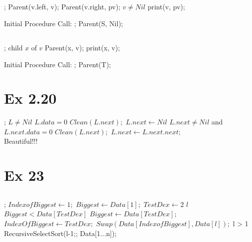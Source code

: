 \subsection{}
  \Prog\qq     %
; \p
Parent(v.left, v);\p
Parent(v.right, pv);\p
\If $v \neq Nil$ \Then\p
print(v, pv);\p
\Endif\qq
\Fini 

 Initial Procedure Call:
  \Prog\qq     %
; \p
Parent(S, Nil);\qq
\Fini 


\subsection{}
\Prog\qq     %
; \p
\Foreach child $x$ of $v$ \Do\p
Parent(x, v);\p
print(x, v);\p
\Endfor\qq
\Fini 

 Initial Procedure Call:
 \Prog\qq     %
; \p
Parent(T);\qq
\Fini 



\section{Ex 2.20}
\Prog\qq     %
; \p
\If $L \neq Nil$  \Then\p
\If $L.data = 0$ \Then\p
$Clean(L.next);$\p
$L.next \leftarrow Nil$\p
\Endif\p
\If $L.next \neq Nil$  and $L.next.data = 0$ \Then\p
$Clean(L.next);$\p
$L.next \leftarrow L.next.next;$\p
\Endif\p
\Endif\qq
\Fini\\
Beautiful!!! 


\section{Ex 23}
\subsection{}
\Prog\qq     %
; \p
$IndexofBiggest \leftarrow 1;$\p
$Biggest \leftarrow Data[1];$\p
\Foreach $TestDex \leftarrow 2 $  \To   $l$ \Do\p
\If $Biggest < Data[TestDex]$ \Then\p
$Biggest \leftarrow Data[TestDex];$\p
$IndexOfBiggest \leftarrow TestDex;$\p
\Endif\p
\Endfor\p
$Swap(Data[IndexofBiggest], Data[l]);$\p
\If l  > 1 \Then\p
RecursiveSelectSort(l-1;; Data[1...n]);\p
\Endif\qq
\Fini


